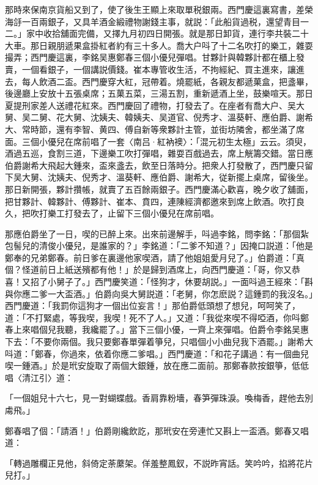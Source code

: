 那時來保南京貨船又到了，使了後生王顯上來取單税銀兩。西門慶這裏寫書，差榮海㧱一百兩銀子，又具羊酒金緞禮物謝錢主事，就説：「此船貨過税，還望青目一二。」家中收拾舖面完備，又擇九月初四日開張。就是那日卸貨，連行李共裝二十大車。那日親朋遞果盒掛紅者約有三十多人。喬大户呌了十二名吹打的樂工，雜耍撮弄；西門慶這裏，李銘吴惠鄭春三個小優兒彈唱。甘夥計與韓夥計都在櫃上發賣，一個看銀子，一個講説價錢。崔本專管收生活，不拘經紀、買主進來，讓進去，每人飲酒二盃。西門慶穿大紅，冠帶着。燒罷紙，各親友都遞菓盒，把盞畢，後邊廳上安放十五張桌席；五菓五菜，三湯五割，重新遞酒上坐，鼓樂喧天。那日夏提刑家差人送禮花紅來。西門慶回了禮物，打發去了。在座者有喬大户、吴大舅、吴二舅、花大舅、沈姨夫、韓姨夫、吴道官、倪秀才、溫葵軒、應伯爵、謝希大、常時節，還有李智、黄四、傅自新等衆夥計主管，並街坊隣舍，都坐滿了席面。三個小優兒在席前唱了一套〈南吕·紅衲襖〉：「混元初生太極」云云。須臾，酒過五巡，食割三道，下邊樂工吹打彈唱，雜耍百戲過去，席上觥籌交錯。當日應伯爵謝希大飛起大鍾來，盃來盞去，飲至日落時分。把衆人打發散了，西門慶只留下吴大舅、沈姨夫、倪秀才、溫葵軒、應伯爵、謝希大，従新擺上桌席，留後坐。那日新開張，夥計攢帳，就賣了五百餘兩銀子。西門慶滿心歡喜，晚夕收了舖面，把甘夥計、韓夥計、傅夥計、崔本、賁四，連陳經濟都邀來到席上飲酒。吹打良久，把吹打樂工打發去了，止留下三個小優兒在席前唱。

那應伯爵坐了一日，喫的已醉上來。出來前邊解手，呌過李銘，問李銘：「那個紮包髻兒的清俊小優兒，是誰家的？」李銘道：「二爹不知道？」因掩口説道：「他是鄭奉的兄弟鄭春。前日爹在裏邊他家喫酒，請了他姐姐愛月兒了。」伯爵道：「真個？怪道前日上紙送殯都有他！」於是歸到酒席上，向西門慶道：「哥，你又恭喜！又招了小舅子了。」西門慶笑道：「怪狗才，休要胡説。」一面呌過王經來：「斟與你應二爹一大盃酒。」伯爵向吳大舅説道：「老舅，你怎麽説？這鍾罰的我沒名。」西門慶道：「我罰你這狗才一個出位妄言！」那伯爵低頭想了想兒，呵呵笑了，道：「不打緊處，等我喫，我喫！死不了人。」又道：「我從來喫不得啞酒，你呌鄭春上來唱個兒我聽，我纔罷了。」當下三個小優，一齊上來彈唱。伯爵令李銘吴惠下去：「不要你兩個。我只要鄭春單彈着箏兒，只唱個小小曲兒我下酒罷。」謝希大呌道：「鄭春，你過來，依着你應二爹唱。」西門慶道：「和花子講過：有一個曲兒喫一鍾酒。」於是玳安旋取了兩個大銀鍾，放在應二面前。那鄭春款按銀箏，低低唱〈清江引〉道：

「一個姐兒十六七，見一對蝴蝶戲。香肩靠粉墻，春笋彈珠淚。喚梅香，趕他去別䖏飛。」

鄭春唱了個：「請酒！」伯爵剛纔飲訖，那玳安在旁連忙又斟上一盃酒。鄭春又唱道：

「轉過雕欄正見他，斜倚定荼䕷架。佯羞整鳳釵，不説昨宵話。笑吟吟，掐將花片兒打。」

